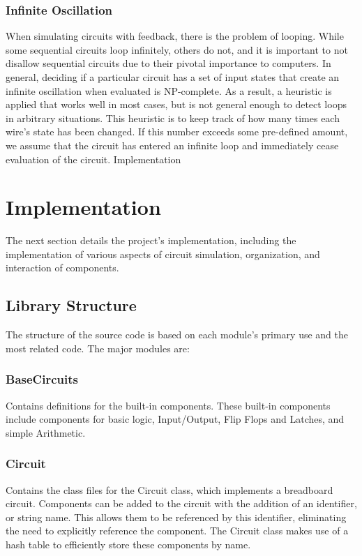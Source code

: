 \documentclass{article}
\begin{document}
\subsubsection{Infinite Oscillation}

When simulating circuits with feedback, there is the problem of looping. While some sequential circuits loop infinitely, others do not, and it is important to not disallow sequential circuits due to their pivotal importance to computers. In general, deciding if a particular circuit has a set of input states that create an infinite oscillation when evaluated is NP-complete. As a result, a heuristic is applied that works well in most cases, but is not general enough to detect loops in arbitrary situations. This heuristic is to keep track of how many times each wire’s state has been changed. If this number exceeds some pre-defined amount, we assume that the circuit has entered an infinite loop and immediately cease evaluation of the circuit.
Implementation

\section{Implementation}

The next section details the project’s implementation, including the implementation of various aspects of circuit simulation, organization, and interaction of components.

\subsection{Library Structure}

The structure of the source code is based on each module’s primary use and the most related code. The major modules are:

\subsubsection{BaseCircuits}

Contains definitions for the built-in components. These built-in components include components for basic logic, Input/Output, Flip Flops and Latches, and simple Arithmetic.

\subsubsection{Circuit}

Contains the class files for the Circuit class, which implements a breadboard circuit. Components can be added to the circuit with the addition of an identifier, or string name. This allows them to be referenced by this identifier, eliminating the need to explicitly reference the component. The Circuit class makes use of a hash table to efficiently store these components by name.
\end{document}
